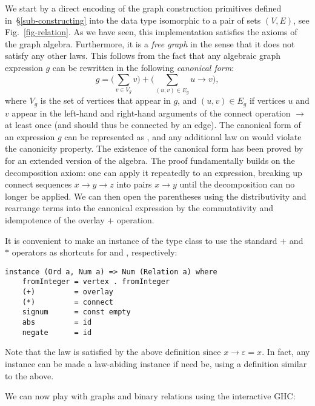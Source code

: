We start by a direct encoding of the graph construction primitives defined
in~\S\ref{sub-constructing} into the  data type isomorphic
to a pair of sets $(V,E)$, see Fig.~\ref{fig-relation}. As we have seen,
this implementation satisfies the axioms of the graph algebra. Furthermore, it
is a \emph{free graph} in the sense that it does not satisfy any other laws.
This follows from the fact that any algebraic graph expression $g$ can be
rewritten in the following \emph{canonical form}:
\[
g = \Big(\sum_{v\in V_g} v\Big) + \Big(\sum_{(u,v)\in E_g} u \rightarrow v\Big),
\]
\vspace{-1mm}
\noindent
where $V_g$ is the set of vertices that appear in $g$, and $(u,v)\in E_g$ if
vertices $u$ and $v$ appear in the left-hand and right-hand arguments of
the connect operation $\rightarrow$ at least once (and should thus be connected
by an edge). The canonical form of an
expression $g$ can be represented as ,
and any additional law on  would violate the canonicity property.
The existence of the canonical form has been proved by~\citet{2014_algebra_mokhov}
for an extended version of the algebra. The proof fundamentally builds on the
decomposition axiom: one can apply it repeatedly to an expression, breaking up
connect sequences $x\rightarrow y\rightarrow z$ into pairs $x \rightarrow y$
until the decomposition can no longer be applied. We can then open the parentheses
using the distributivity and rearrange terms into the canonical expression
by the commutativity and idempotence of the overlay $+$ operation.

It is convenient to make  an instance of the  type class
to use the standard $+$ and $*$ operators as shortcuts for  and
, respectively:

\begin{verbatim}
instance (Ord a, Num a) => Num (Relation a) where
    fromInteger = vertex . fromInteger
    (+)         = overlay
    (*)         = connect
    signum      = const empty
    abs         = id
    negate      = id
\end{verbatim}

\noindent
Note that the  law  is satisfied by the above
definition since $x \rightarrow \varepsilon = x$. In fact, any  instance
can be made a law-abiding  instance if need be, using a definition similar to the above.

We can now play with graphs and binary relations using the interactive GHC:

